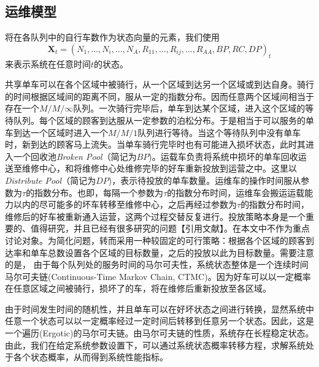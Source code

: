 \documentclass{article}
\begin{document}
\subsection{运维模型}
将在各队列中的自行车数作为状态向量的元素，我们使用$$\boldsymbol{X}_t = (N_1, \dots, N_{i}, \dots, N_A, R_{11}, \dots, R_{ij}, \dots, R_{AA}, BP, RC, DP)_t$$ 来表示系统在任意时间$t$的状态。

共享单车可以在各个区域中被骑行，从一个区域到达另一个区域或到达自身。骑行的时间根据区域间的距离不同，服从一定的指数分布。因而任意两个区域间相当于存在一个$M/M/\infty$队列。一次骑行完毕后，单车到达某个区域，进入这个区域的等待队列。每个区域的顾客到达服从一定参数的泊松分布。于是相当于可以服务的单车到达一个区域时进入一个$M/M/1$队列进行等待。当这个等待队列中没有单车时，新到达的顾客马上流失。当单车骑行完毕时也有可能进入损坏状态，此时其进入一个回收池\textit{Broken Pool}（简记为$BP$)。运载车负责将系统中损坏的单车回收运送至维修中心，和将维修中心处维修完毕的好车重新投放到运营之中。这里以\textit{Distribute Pool}（简记为$DP$)，表示待投放的单车数量。运维车的操作时间服从参数为$\tau$的指数分布。也即，每隔一个参数为$\tau$的指数分布时间，运维车会搬运运载能力以内的尽可能多的坏车转移至维修中心，之后再经过参数为$\tau$的指数分布时间，维修后的好车被重新通入运营，这两个过程交替反复进行。投放策略本身是一个重要的、值得研究，并且已经有很多研究的问题【引用文献】。在本文中不作为重点讨论对象。为简化问题，转而采用一种较固定的可行策略：根据各个区域的顾客到达率和单车总数设置各个区域的目标数量，之后的投放以此为目标数量。需要注意的是，%
由于每个队列处的服务时间的马尔可夫性，系统状态整体是一个连续时间马尔可夫链(Continuous-Time Markov Chain, CTMC)。因为好车可以以一定概率在任意区域之间被骑行，损坏了的车，将在维修后重新投放至各区域。

由于时间发生时间的随机性，并且单车可以在好坏状态之间进行转换，显然系统中任意一个状态可以以一定概率经过一定时间后转移到任意另一个状态。因此，这是一个遍历(Ergotic)的马尔可夫链。由马尔可夫链的性质，系统存在长程稳定状态。由此，我们在给定系统参数设置下，可以通过系统状态概率转移方程，求解系统处于各个状态概率，从而得到系统性能指标。
\end{document}
